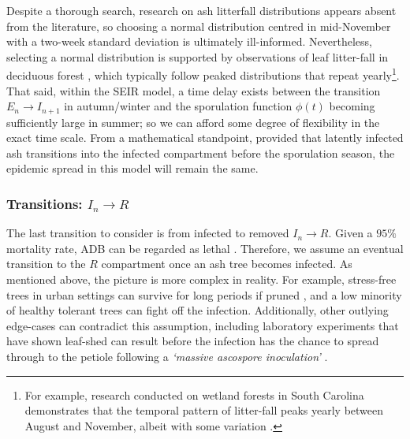 Despite a thorough search, research on ash litterfall distributions appears absent from the literature, 
so choosing a normal distribution centred in mid-November with a two-week standard deviation is ultimately ill-informed. 
Nevertheless, selecting a normal distribution is supported by observations of leaf litter-fall in deciduous 
forest \cite{zhang2014seasonal, dixon1976analysis}, which typically follow peaked distributions that repeat yearly\footnote{
    For example, research conducted on wetland forests in South Carolina demonstrates that the temporal pattern of litter-fall
    peaks yearly between August and November, albeit with some variation \cite{shure1985litter}.}.
That said, within the SEIR model, a time delay exists between the transition $E_n \rightarrow I_{n+1}$ in autumn/winter and the 
sporulation function $\phi(t)$ becoming sufficiently large in summer; so we can afford some degree of flexibility in the exact time scale.
From a mathematical standpoint, provided that latently infected ash transitions into the infected compartment before the sporulation season,
the epidemic spread in this model will remain the same.


\subsubsection{Transitions: $I_n\rightarrow R$}
\label{sec:I-to-R}
The last transition to consider is from infected to removed $I_{n}\rightarrow R$. 
Given a $95\%$ mortality rate, ADB can be regarded as lethal \cite{ash-dieback-costs}. 
Therefore, we assume an eventual transition to the $R$ compartment once an ash tree becomes infected.
As mentioned above, the picture is more complex in reality. 
For example, stress-free trees in urban settings can survive for long periods if pruned \cite{marciulyniene2017can}, and a low minority of healthy tolerant trees can fight off the infection.
Additionally, other outlying edge-cases can contradict this assumption, including
laboratory experiments that have shown leaf-shed can result before the infection has the chance to spread through to the petiole following a \textit{`massive ascospore inoculation'} \cite{https://doi.org/10.1111/mpp.12073}.

